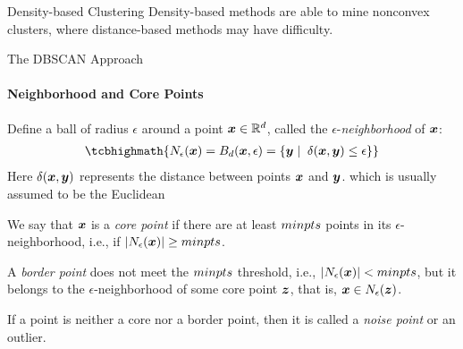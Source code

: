 
\date{Chapter 15: Density-based Clustering}

\begin{frame}
\titlepage
\end{frame}


\begin{frame}{Density-based Clustering}
Density-based methods 
are able to mine nonconvex clusters, where distance-based methods may
have difficulty.
\begin{figure}
\begin{center}
\end{center}
\end{figure}
\end{frame}



\begin{frame}{The DBSCAN Approach}
\framesubtitle{Neighborhood and Core Points}
Def\/{i}ne a ball of radius $\epsilon$ around a point
${\boldsymbol x} \in {\mathord{\mathbb R}}^d$, called the $\epsilon$-{\em neighborhood} of ${\boldsymbol x}$:
\begin{align*}
\tcbhighmath{
  N_{\epsilon}(\bx) = B_d(\bx,\epsilon) = \{\by \mid
  \;\dist(\bx,\by) \leq \epsilon\}
}
\end{align*}
Here $\delta({\boldsymbol x}, {\boldsymbol y})$ represents the distance between points
${\boldsymbol x}$ and ${\boldsymbol y}$.
which is usually assumed to be the Euclidean

\medskip
We say that ${\boldsymbol x}$ is a {\em core
point} if there are at least $minpts$ points in its
$\epsilon$-neighborhood, i.e., if 
$|N_{\epsilon}({\boldsymbol x})| \geq
minpts$.

\medskip
A {\em border point}
does not meet the $minpts$ threshold, i.e.,
$|N_{\epsilon}({\boldsymbol x})| < minpts$, but it belongs to the $\epsilon$-neighborhood of some core point ${\boldsymbol z}$, that is, ${\boldsymbol x} \in N_\epsilon({\boldsymbol z})$.

\medskip
If a point is neither a core nor a border point, then it
is called a {\em noise point} or an outlier.
\end{frame}


